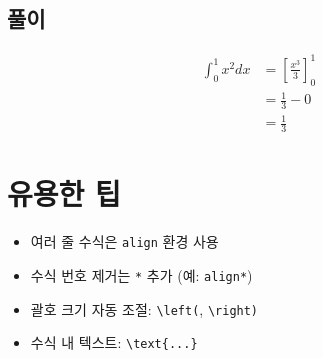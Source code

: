 \documentclass[12pt,a4paper]{article}
\begin{document}
\subsection{풀이}
\begin{align}
    \int_0^1 x^2 dx &= \left[ \frac{x^3}{3} \right]_0^1 \\
                     &= \frac{1}{3} - 0 \\
                     &= \frac{1}{3}
\end{align}

\section{유용한 팁}

\begin{itemize}
    \item 여러 줄 수식은 \texttt{align} 환경 사용
    \item 수식 번호 제거는 \texttt{*} 추가 (예: \texttt{align*})
    \item 괄호 크기 자동 조절: \texttt{\textbackslash left(}, \texttt{\textbackslash right)}
    \item 수식 내 텍스트: \texttt{\textbackslash text\{...\}}
\end{itemize}

\end{document}
